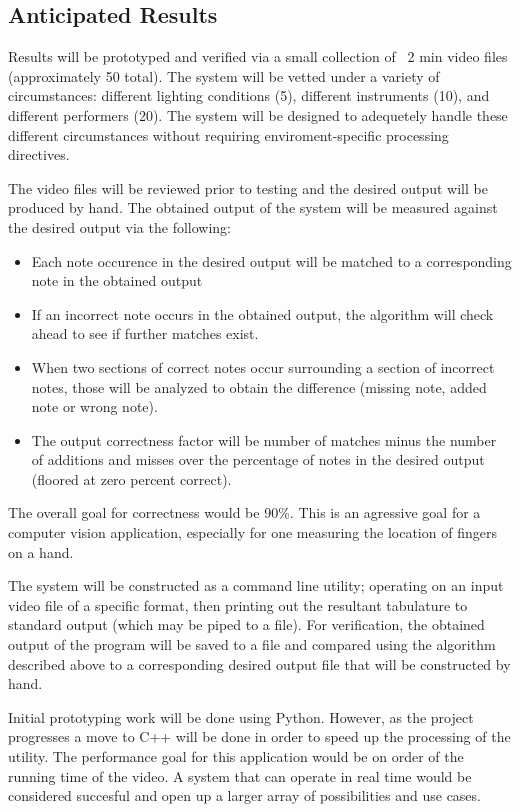 \subsection{Anticipated Results}
Results will be prototyped and verified via a small collection of ~2 min video files
(approximately 50 total).
The system will be vetted under a variety of circumstances:
different lighting conditions (5),
different instruments (10),
and different performers (20).
The system will be designed to adequetely handle these different circumstances
without requiring enviroment-specific processing directives.
\par
The video files will be reviewed prior to testing and the desired output will be produced by hand.
The obtained output of the system will be measured against the desired output via the following:
\begin{itemize}
    \item Each note occurence in the desired output will be matched to a corresponding note in the obtained output
    \item If an incorrect note occurs in the obtained output, the algorithm will check ahead to see if further
        matches exist.
    \item When two sections of correct notes occur surrounding a section of incorrect notes, those will
        be analyzed to obtain the difference (missing note, added note or wrong note).
    \item The output correctness factor will be number of matches minus the number of additions and misses
        over the percentage of notes in the desired output (floored at zero percent correct).
\end{itemize}
\par
The overall goal for correctness would be 90\%.
This is an agressive goal for a computer vision application,
especially for one measuring the location of fingers on a hand.
\par
The system will be constructed as a command line utility; operating on an input video file of a specific format,
then printing out the resultant tabulature to standard output (which may be piped to a file).
For verification, the obtained output of the program will be saved to a file and compared using the algorithm
described above to a corresponding desired output file that will be constructed by hand.
\par
Initial prototyping work will be done using Python.
However, as the project progresses a move to C++ will be done in order to speed up the processing of the utility.
The performance goal for this application would be on order of the running time of the video.
A system that can operate in real time would be considered succesful and open up a larger array of possibilities and use cases.
